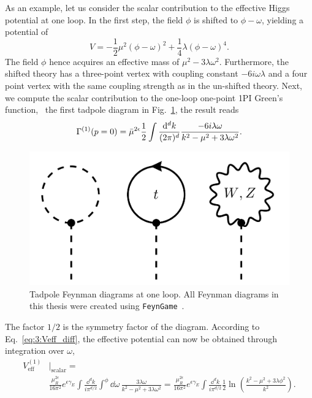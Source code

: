 As an example, let us consider the scalar contribution to the effective Higgs potential at one loop. In the first step, the field $\phi$ is shifted to $\phi - \omega$, yielding a potential of
\begin{equation}
V = -\frac{1}{2} \mu^2 (\phi - \omega)^2 + \frac{1}{4} \lambda (\phi - \omega)^4.
\end{equation}
The field $\phi$ hence acquires an effective mass of $\mu^2 - 3 \lambda \omega^2$. Furthermore, the shifted theory has a three-point vertex with coupling constant $- 6i\omega \lambda$ and a four point vertex with the same coupling strength as in the un-shifted theory. Next, we compute the scalar contribution to the one-loop one-point \acs{1PI} Green's function, \ie\ the first tadpole diagram in Fig.~\ref{fig:3:tadpoles}, the result reads
\begin{equation}
\Gamma^{(1)} (p = 0) = \bar{\mu}^{2 \epsilon} \frac{1}{2} \int \frac{\mathrm{d}^d k}{(2 \pi)^d} \frac{-6i \lambda \omega}{k^2 - \mu^2 + 3 \lambda \omega^2}.
\end{equation}
\begin{figure}[ht]
\centering
\includegraphics[scale=0.25]{Images/tadpoles.pdf}
\caption{Tadpole Feynman diagrams at one loop. All Feynman diagrams in this thesis were created using \texttt{FeynGame}~\cite{Harlander:2020cyh, Harlander:2024qbn, Bundgen:2025utt}.}
\label{fig:3:tadpoles}
\end{figure}
The factor $1/2$ is the symmetry factor of the diagram. According to Eq.~\eqref{eq:3:Veff_diff}, the effective potential can now be obtained through integration over $\omega$,
\begin{equation}
\begin{split}
V_\text{eff}^{(1)} &\big \vert_{\text{scalar}} =  \\
&\frac{\mu_R^{2 \epsilon}}{16 \pi^2} e^{\epsilon \gamma_E} \int \frac{\dd^d k}{i \pi^{d/2}} \int^{\phi} \dd \omega\, \frac{3 \lambda \omega}{k^2 - \mu^2 + 3 \lambda \omega^2} = \frac{\mu_R^{2 \epsilon}}{16 \pi^2} e^{\epsilon \gamma_E} \int \frac{\dd^d k}{i \pi^{d/2}} \frac{1}{2} \ln\! \left( \frac{k^2 - \mu^2 + 3 \lambda \phi^2}{k^2} \right).
\end{split}
\end{equation}
